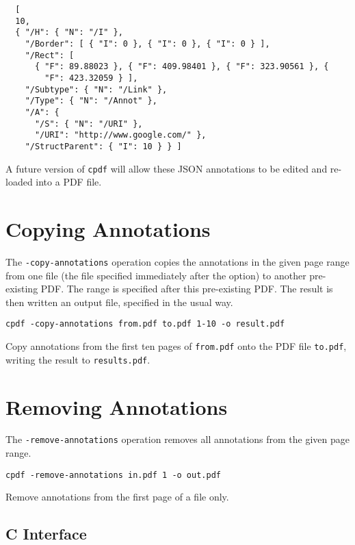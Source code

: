 \documentclass{book}
\begin{document}
{\small\begin{verbatim}
  [
  10,
  { "/H": { "N": "/I" },
    "/Border": [ { "I": 0 }, { "I": 0 }, { "I": 0 } ],
    "/Rect": [
      { "F": 89.88023 }, { "F": 409.98401 }, { "F": 323.90561 }, {
        "F": 423.32059 } ],
    "/Subtype": { "N": "/Link" },
    "/Type": { "N": "/Annot" },
    "/A": {
      "/S": { "N": "/URI" },
      "/URI": "http://www.google.com/" },
    "/StructParent": { "I": 10 } } ]
\end{verbatim}}

A future version of \texttt{cpdf} will allow these JSON annotations to be edited and re-loaded into a PDF file.

  \section{Copying Annotations}
  The \texttt{-copy-annotations} operation copies the annotations in the given
page range from one file (the file specified immediately after the option) to
another pre-existing PDF. The range is specified after this pre-existing PDF.
The result is then written an output file, specified in the usual way.
  \begin{framed}
    \small\verb!cpdf -copy-annotations from.pdf to.pdf 1-10 -o result.pdf !
    
    \vspace{2.5mm}
    \noindent Copy annotations from the first ten pages of \texttt{from.pdf}
onto the PDF file \texttt{to.pdf}, writing the result to \texttt{results.pdf}.

  \end{framed}

  \section{Removing Annotations}
  The \texttt{-remove-annotations} operation removes all annotations from the
given page range.

  \begin{framed}
    \small\verb!cpdf -remove-annotations in.pdf 1 -o out.pdf!
    
    \vspace{2.5mm}
    \noindent Remove annotations from the first page of a file only.
  \end{framed}

\begin{cpdflib}
\clearpage
\section*{C Interface}
\begin{small}\tt

\end{small}
\end{cpdflib}
\end{document}
